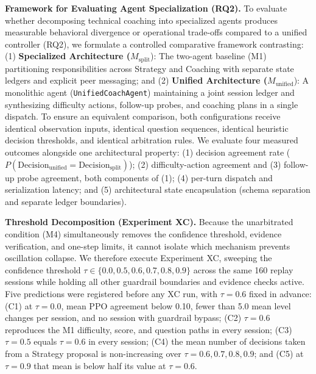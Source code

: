 \documentclass[runningheads]{llncs}
\begin{document}
\textbf{Framework for Evaluating Agent Specialization (RQ2).} To evaluate whether decomposing technical coaching into specialized agents produces measurable behavioral divergence or operational trade-offs compared to a unified controller (RQ2), we formulate a controlled comparative framework contrasting: (1) \textbf{Specialized Architecture ($M_{\mathrm{split}}$}): The two-agent baseline (M1) partitioning responsibilities across Strategy and Coaching with separate state ledgers and explicit peer messaging; and (2) \textbf{Unified Architecture ($M_{\mathrm{unified}}$}): A monolithic agent (\texttt{UnifiedCoachAgent}) maintaining a joint session ledger and synthesizing difficulty actions, follow-up probes, and coaching plans in a single dispatch. To ensure an equivalent comparison, both configurations receive identical observation inputs, identical question sequences, identical heuristic decision thresholds, and identical arbitration rules. We evaluate four measured outcomes alongside one architectural property: (1) decision agreement rate ($P(\mathrm{Decision}_{\mathrm{unified}} = \mathrm{Decision}_{\mathrm{split}})$); (2) difficulty-action agreement and (3) follow-up probe agreement, both components of (1); (4) per-turn dispatch and serialization latency; and (5) architectural state encapsulation (schema separation and separate ledger boundaries).

\textbf{Threshold Decomposition (Experiment XC).} Because the unarbitrated condition (M4) simultaneously removes the confidence threshold, evidence verification, and one-step limits, it cannot isolate which mechanism prevents oscillation collapse. We therefore execute Experiment XC, sweeping the confidence threshold $\tau \in \{0.0, 0.5, 0.6, 0.7, 0.8, 0.9\}$ across the same 160 replay sessions while holding all other guardrail boundaries and evidence checks active. Five predictions were registered before any XC run, with $\tau=0.6$ fixed in advance: (C1) at $\tau=0.0$, mean PPO agreement below 0.10, fewer than 5.0 mean level changes per session, and no session with guardrail bypass; (C2) $\tau=0.6$ reproduces the M1 difficulty, score, and question paths in every session; (C3) $\tau=0.5$ equals $\tau=0.6$ in every session; (C4) the mean number of decisions taken from a Strategy proposal is non-increasing over $\tau=0.6, 0.7, 0.8, 0.9$; and (C5) at $\tau=0.9$ that mean is below half its value at $\tau=0.6$.
\end{document}
